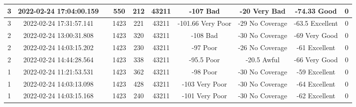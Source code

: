 \begin{longtable*}{|c|c|c|c|c|c|c|c|c|c|}
3&2022-02-24 17:04:00.159&&550&212&43211& -107      Bad         & -20       Very Bad    & -74.33    Good        & 0\\\hline
{}3&2022-02-24 17:31:57.141&&1423&221&43211& -101.66   Very Poor   & -29       No Coverage & -63.5     Excellent   & 0\\\hline
{}2&2022-02-24 13:00:31.808&&1423&320&43211& -108      Bad         & -30       No Coverage & -69       Very Good   & 0\\\hline
{}2&2022-02-24 14:03:15.202&&1423&230&43211& -97       Poor        & -26       No Coverage & -61       Excellent   & 0\\\hline
{}2&2022-02-24 14:44:28.564&&1423&338&43211& -95.5     Poor        & -20.5     Awful       & -66       Very Good   & 0\\\hline
{}1&2022-02-24 11:21:53.531&&1423&362&43211& -98       Poor        & -30       No Coverage & -59       Excellent   & 0\\\hline
{}1&2022-02-24 14:03:13.098&&1423&428&43211& -103      Very Poor   & -30       No Coverage & -64       Excellent   & 0\\\hline
{}1&2022-02-24 14:03:15.168&&1423&240&43211& -101      Very Poor   & -30       No Coverage & -62       Excellent   & 0\\\hline

\end{longtable*}
